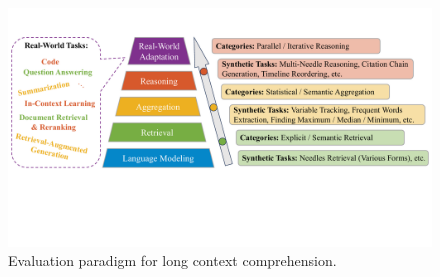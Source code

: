 \documentclass[11pt, a4paper, logo, copyright, nonumbering]{map}
\begin{document}
\begin{figure}[t]
    \centering
    \includegraphics[width=1.0\textwidth]{graphs/EvalParadigm.pdf}
    \caption{Evaluation paradigm for long context comprehension.}
    \label{fig:eval_paradigm}
\end{figure}
\end{document}
